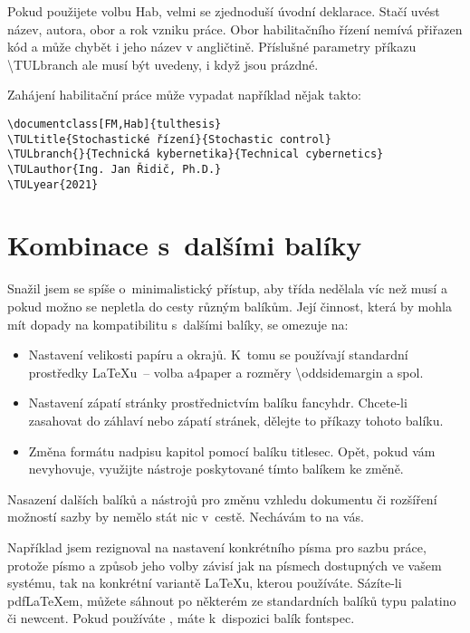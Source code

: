 \documentclass[FM,SP]{tulthesis}
\makeatletter
\newcommand{\argument}[1]{{\ttfamily\color{\tulcolor}#1}}
\newcommand{\argumentindex}[1]{\argument{#1}\index{#1}}
\newcommand{\prikazneindex}[1]{\argument{\textbackslash #1}}
\newcommand{\prikaz}[1]{\prikazneindex{#1}\index{#1@\textbackslash #1}}
\newenvironment{myquote}{\begin{list}{}{\setlength\leftmargin\parindent}\item[]}{\end{list}}
\newenvironment{listing}{\begin{myquote}\color{\tulcolor}}{\end{myquote}}
\makeatother
\begin{document}
Pokud použijete volbu \argumentindex{Hab}, velmi se zjednoduší úvodní
deklarace. Stačí uvést název, autora, obor a rok vzniku práce. Obor
habilitačního řízení nemívá přiřazen kód a může chybět i jeho název v
angličtině. Příslušné parametry příkazu \prikaz{TULbranch} ale musí být
uvedeny, i když jsou prázdné.

Zahájení habilitační práce může vypadat například nějak takto:

\begin{listing}
\begin{verbatim}
\documentclass[FM,Hab]{tulthesis}
\TULtitle{Stochastické řízení}{Stochastic control}
\TULbranch{}{Technická kybernetika}{Technical cybernetics}
\TULauthor{Ing. Jan Řidič, Ph.D.}
\TULyear{2021}
\end{verbatim}
\end{listing}


\section{Kombinace s~dalšími balíky}

Snažil jsem se spíše o~minimalistický přístup, aby třída nedělala víc než musí
a pokud možno se nepletla do cesty různým balíkům. Její činnost, která by
mohla mít dopady na kompatibilitu s~dalšími balíky, se omezuje na:

\begin{itemize}
\item Nastavení velikosti papíru a okrajů. K~tomu se používají standardní
prostředky \LaTeX u~-- volba \argument{a4paper} a rozměry
\prikazneindex{oddsidemargin} a spol.

\item Nastavení zápatí stránky prostřednictvím balíku \argument{fancyhdr}.
Chcete-li zasahovat do záhlaví nebo zápatí stránek, dělejte to příkazy tohoto
balíku.

\item Změna formátu nadpisu kapitol pomocí balíku \argument{titlesec}. Opět,
pokud vám nevyhovuje, využijte nástroje poskytované tímto balíkem ke změně.

\end{itemize}

Nasazení dalších balíků a nástrojů pro změnu vzhledu dokumentu či rozšíření
možností sazby by nemělo stát nic v~cestě. Nechávám to na vás.

Například jsem rezignoval na nastavení konkrétního písma pro sazbu práce,
protože písmo a způsob jeho volby závisí jak na písmech dostupných ve vašem
systému, tak na konkrétní variantě \LaTeX u, kterou používáte. Sázíte-li
pdf\-\LaTeX\-em, můžete sáhnout po některém ze standardních balíků typu
\argument{palatino} či \argument{newcent}. Pokud používáte \XeLaTeX, máte
k~dispozici balík \argument{fontspec}.
\end{document}
